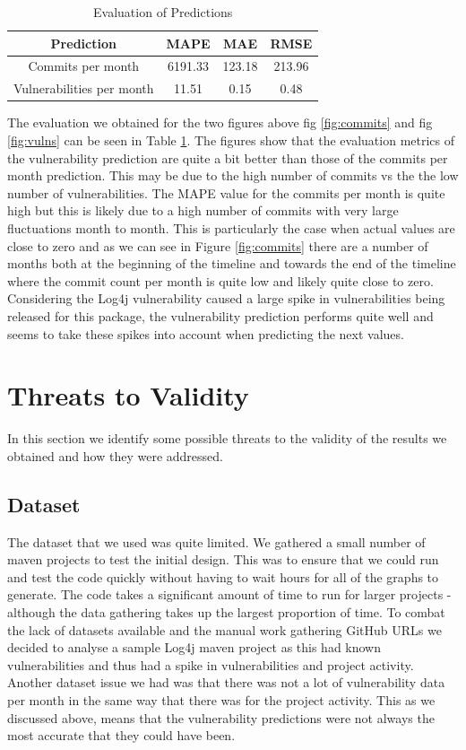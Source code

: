 \documentclass[conference]{IEEEtran}
\begin{document}
\begin{table}[H]
 \caption{Evaluation of Predictions}
\label{evaluations}
\begin{center}
\begin{tabular}{|c|c|c|c|}
\hline
    \textbf{Prediction} & \textbf{MAPE} & \textbf{MAE} & \textbf{RMSE} \\ \hline
    Commits per month & 6191.33 & 123.18 & 213.96 \\ \hline
    Vulnerabilities per month & 11.51 & 0.15 & 0.48 \\ \hline
\end{tabular}
\end{center}
\end{table}

The evaluation we obtained for the two figures above fig \ref{fig:commits} and fig \ref{fig:vulns} can be seen in Table \ref{evaluations}. The figures show that the evaluation metrics of the vulnerability prediction are quite a bit better than those of the commits per month prediction. This may be due to the high number of commits vs the the low number of vulnerabilities. The MAPE value for the commits per month is quite high but this is likely due to a high number of commits with very large fluctuations month to month. This is particularly the case when actual values are close to zero and as we can see in Figure \ref{fig:commits} there are a number of months both at the beginning of the timeline and towards the end of the timeline where the commit count per month is quite low and likely quite close to zero. Considering the Log4j vulnerability caused a large spike in vulnerabilities being released for this package, the vulnerability prediction performs quite well and seems to take these spikes into account when predicting the next values. 

\section{Threats to Validity}
In this section we identify some possible threats to the validity of the results we obtained and how they were addressed. 

\subsection{Dataset}
The dataset that we used was quite limited. We gathered a small number of maven projects to test the initial design. This was to ensure that we could run and test the code quickly without having to wait hours for all of the graphs to generate. The code takes a significant amount of time to run for larger projects - although the data gathering takes up the largest proportion of time. To combat the lack of datasets available and the manual work gathering GitHub URLs we decided to analyse a sample Log4j maven project as this had known vulnerabilities and thus had a spike in vulnerabilities and project activity. Another dataset issue we had was that there was not a lot of vulnerability data per month in the same way that there was for the project activity. This as we discussed above, means that the vulnerability predictions were not always the most accurate that they could have been. 
\end{document}
